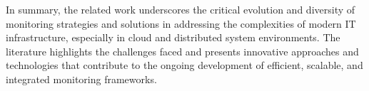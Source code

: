 In summary, the related work underscores the critical evolution and diversity of monitoring strategies and solutions in addressing the complexities of modern IT infrastructure, especially in cloud and distributed system environments. The literature highlights the challenges faced and presents innovative approaches and technologies that contribute to the ongoing development of efficient, scalable, and integrated monitoring frameworks. 







